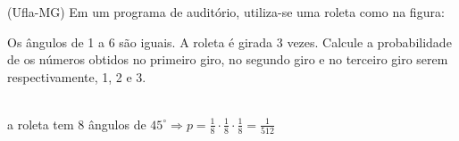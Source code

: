 \begin{ex}
(Ufla-MG) Em um programa de auditório, utiliza-se uma roleta como na figura:
 \begin{center}
 \end{center}


Os ângulos de 1 a 6 são iguais. A roleta é girada 3 vezes. Calcule a probabilidade de os números obtidos no primeiro giro, no segundo giro e no terceiro giro serem respectivamente, 1, 2 e 3.
 \begin{sol}
   \phantom{A} \\
   a roleta tem 8 ângulos de $45^{\circ} \Longrightarrow p= \frac{1}{8}\cdot \frac{1}{8}\cdot \frac{1}{8}=\frac{1}{512}$ 
 \end{sol}
\end{ex}